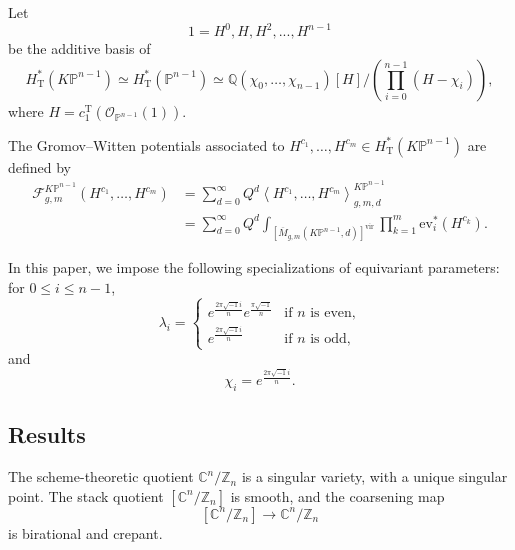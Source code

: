\documentclass[12pt]{amsart}
\numberwithin{equation}{section}
\newcommand{\CnZn}{[\mathbb{C}^n/\mathbb{Z}_n]}
\newcommand{\KP}{K\mathbb{P}}
\begin{document}
Let
$$1=H^0, H, H^2, ..., H^{n-1}$$ be the additive basis of
\begin{equation*}
H_\mathrm{T}^*(K\mathbb{P}^{n-1})\simeq H_{\mathrm{T}}^*\left(\mathbb{P}^{n-1}\right) \simeq \mathbb{Q}(\chi_0, \ldots, \chi_{n-1})\left[H\right] \big/\left(\prod_{i=0}^{n-1}\left(H-\chi_i\right)\right),
\end{equation*}
 where $H=c_1^{\mathrm{T}}(\mathcal{O}_{\mathbb{P}^{n-1}}(1))$.

The Gromov--Witten potentials associated to $H^{c_1},\ldots,H^{c_m}\in H_\mathrm{T}^*(K\mathbb{P}^{n-1})$ are defined by
\begin{equation}
\begin{aligned}
\mathcal{F}_{g, m}^{\KP^{n-1}}\left(H^{c_1}, \ldots, H^{c_m}\right)
&=\sum_{d=0}^{\infty} {Q^d}\left\langle H^{c_1},\ldots,H^{c_m} \right\rangle_{g,m,d}^{\KP^{n-1}}\\
&=\sum_{d=0}^{\infty} {Q^d} \int_{\left[\overline{M}_{g, m}\left(\KP^{n-1}, d\right)\right]^{\mathrm{vir}}} \prod_{k=1}^m \mathrm{ev}_i^*\left(H^{c_k}\right).
\end{aligned}
\end{equation}

In this paper, we impose the following specializations of equivariant parameters: for $0\leq i \leq n-1$,
\begin{equation}\label{eqn:specialization}
   \lambda_i=\begin{cases} 
      e^{\frac{2\pi\sqrt{-1}i}{n}}e^{\frac{\pi\sqrt{-1}}{n}}& \text{if $n$ is even,}\\
      e^{\frac{2\pi\sqrt{-1}i}{n}} & \text{if $n$ is odd},
     \end{cases}
\end{equation}
and
\begin{equation}\label{eqn:specialization_KP}
\chi_i= e^{\frac{2\pi\sqrt{-1}i}{n}}.
\end{equation}


\subsection{Results}
The scheme-theoretic quotient $\mathbb{C}^n/\mathbb{Z}_n$ is a singular variety, with a unique singular point. The stack quotient $\CnZn$ is smooth, and the coarsening map 
\begin{equation}\label{eqn:mapCnZn}
\CnZn\to \mathbb{C}^n/\mathbb{Z}_n    
\end{equation}
is birational and crepant.
\end{document}
